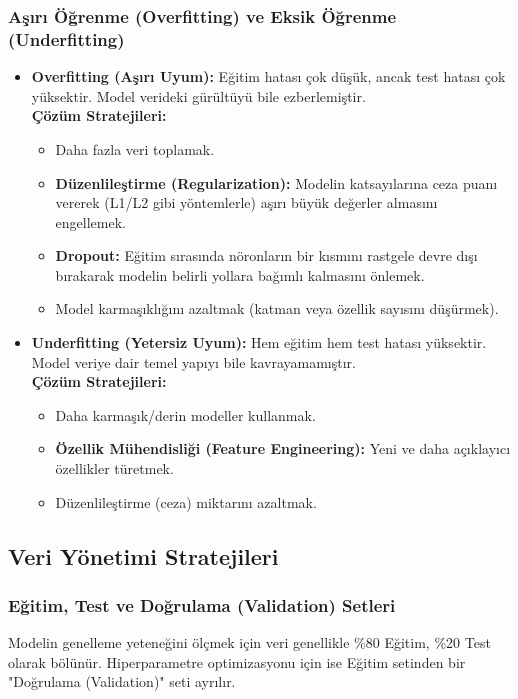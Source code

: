 \documentclass[12pt,a4paper]{article}
\begin{document}
\subsubsection{Aşırı Öğrenme (Overfitting) ve Eksik Öğrenme (Underfitting)}
\begin{itemize}
    \item \textbf{Overfitting (Aşırı Uyum):} Eğitim hatası çok düşük, ancak test hatası çok yüksektir. Model verideki gürültüyü bile ezberlemiştir.
    \\ \textbf{Çözüm Stratejileri:} 
    \begin{itemize}
        \item Daha fazla veri toplamak.
        \item \textbf{Düzenlileştirme (Regularization):} Modelin katsayılarına ceza puanı vererek (L1/L2 gibi yöntemlerle) aşırı büyük değerler almasını engellemek.
        \item \textbf{Dropout:} Eğitim sırasında nöronların bir kısmını rastgele devre dışı bırakarak modelin belirli yollara bağımlı kalmasını önlemek.
        \item Model karmaşıklığını azaltmak (katman veya özellik sayısını düşürmek).
    \end{itemize}
    
    \item \textbf{Underfitting (Yetersiz Uyum):} Hem eğitim hem test hatası yüksektir. Model veriye dair temel yapıyı bile kavrayamamıştır.
    \\ \textbf{Çözüm Stratejileri:} 
    \begin{itemize}
        \item Daha karmaşık/derin modeller kullanmak.
        \item \textbf{Özellik Mühendisliği (Feature Engineering):} Yeni ve daha açıklayıcı özellikler türetmek.
        \item Düzenlileştirme (ceza) miktarını azaltmak.
    \end{itemize}
\end{itemize}

\subsection{Veri Yönetimi Stratejileri}
\subsubsection{Eğitim, Test ve Doğrulama (Validation) Setleri}
Modelin genelleme yeteneğini ölçmek için veri genellikle \%80 Eğitim, \%20 Test olarak bölünür. Hiperparametre optimizasyonu için ise Eğitim setinden bir "Doğrulama (Validation)" seti ayrılır.
\end{document}
